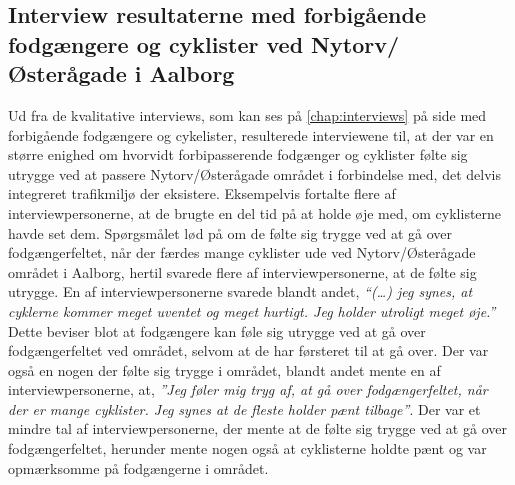 \subsection{Interview resultaterne med forbigående fodgængere og cyklister ved Nytorv/Østerågade i Aalborg}
Ud fra de kvalitative interviews, som kan ses på \cref{chap:interviews} på side \pageref{chap:interviews} med forbigående fodgængere og cykelister, resulterede interviewene til, at der var en større enighed om hvorvidt forbipasserende fodgænger og cyklister følte sig utrygge ved at passere Nytorv/Østerågade området i forbindelse med, det delvis integreret
trafikmiljø der eksistere. Eksempelvis fortalte flere af interviewpersonerne, at de brugte en del tid på at holde øje med, om cyklisterne havde set dem. Spørgsmålet lød på om de følte sig trygge ved at gå over fodgængerfeltet, når der færdes mange cyklister ude ved Nytorv/Østerågade området i Aalborg, hertil svarede flere af interviewpersonerne, at de følte sig utrygge. En af interviewpersonerne svarede blandt andet, \emph{“(…) jeg synes, at cyklerne kommer meget uventet og meget hurtigt. Jeg holder utroligt meget øje.”} Dette beviser blot at fodgængere kan føle sig utrygge ved at gå over fodgængerfeltet ved området, selvom at de har førsteret til at gå over. Der var også en nogen der følte sig trygge i området, blandt andet mente en af interviewpersonerne, at, \emph{”Jeg føler mig tryg af, at gå over fodgængerfeltet, når der er mange cyklister. Jeg synes at de fleste holder pænt tilbage”}. Der var et mindre tal af interviewpersonerne, der mente at de følte sig trygge ved at gå over fodgængerfeltet, herunder mente nogen også at cyklisterne holdte pænt og var opmærksomme på fodgængerne i området.
\\
